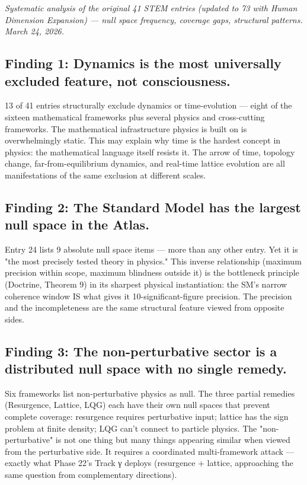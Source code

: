 \textit{Systematic analysis of the original 41 STEM entries (updated to 73 with Human Dimension Expansion) — null space frequency, coverage gaps, structural patterns. March 24, 2026.}


\subsection*{Finding 1: Dynamics is the most universally excluded feature, not consciousness.}


13 of 41 entries structurally exclude dynamics or time-evolution — eight of the sixteen mathematical frameworks plus several physics and cross-cutting frameworks. The mathematical infrastructure physics is built on is overwhelmingly static. This may explain why time is the hardest concept in physics: the mathematical language itself resists it. The arrow of time, topology change, far-from-equilibrium dynamics, and real-time lattice evolution are all manifestations of the same exclusion at different scales.


\subsection*{Finding 2: The Standard Model has the largest null space in the Atlas.}


Entry 24 lists 9 absolute null space items — more than any other entry. Yet it is "the most precisely tested theory in physics." This inverse relationship (maximum precision within scope, maximum blindness outside it) is the bottleneck principle (Doctrine, Theorem 9) in its sharpest physical instantiation: the SM's narrow coherence window IS what gives it 10-significant-figure precision. The precision and the incompleteness are the same structural feature viewed from opposite sides.


\subsection*{Finding 3: The non-perturbative sector is a distributed null space with no single remedy.}


Six frameworks list non-perturbative physics as null. The three partial remedies (Resurgence, Lattice, LQG) each have their own null spaces that prevent complete coverage: resurgence requires perturbative input; lattice has the sign problem at finite density; LQG can't connect to particle physics. The "non-perturbative" is not one thing but many things appearing similar when viewed from the perturbative side. It requires a coordinated multi-framework attack — exactly what Phase 22's Track γ deploys (resurgence + lattice, approaching the same question from complementary directions).


